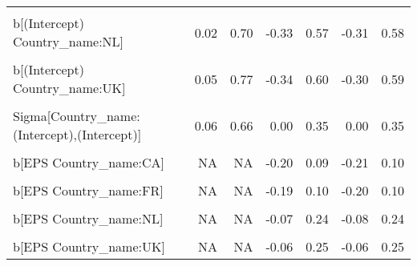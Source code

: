 \begin{table}
\begin{tabular}[t]{lrrrrrr}
\cellcolor{gray!10}{b[(Intercept) Country\_name:IL]} & \cellcolor{gray!10}{-0.88} & \cellcolor{gray!10}{0.77} & \cellcolor{gray!10}{-0.53} & \cellcolor{gray!10}{0.42} & \cellcolor{gray!10}{-0.56} & \cellcolor{gray!10}{0.43}\\
b[(Intercept) Country\_name:NL] & 0.02 & 0.70 & -0.33 & 0.57 & -0.31 & 0.58\\
\cellcolor{gray!10}{b[(Intercept) Country\_name:SE]} & \cellcolor{gray!10}{-0.76} & \cellcolor{gray!10}{-0.01} & \cellcolor{gray!10}{-0.60} & \cellcolor{gray!10}{0.32} & \cellcolor{gray!10}{-0.62} & \cellcolor{gray!10}{0.34}\\
b[(Intercept) Country\_name:UK] & 0.05 & 0.77 & -0.34 & 0.60 & -0.30 & 0.59\\
\cellcolor{gray!10}{b[(Intercept) Country\_name:US]} & \cellcolor{gray!10}{-0.60} & \cellcolor{gray!10}{0.16} & \cellcolor{gray!10}{-0.52} & \cellcolor{gray!10}{0.29} & \cellcolor{gray!10}{-0.49} & \cellcolor{gray!10}{0.29}\\
Sigma[Country\_name:(Intercept),(Intercept)] & 0.06 & 0.66 & 0.00 & 0.35 & 0.00 & 0.35\\
\cellcolor{gray!10}{b[EPS Country\_name:BE]} & \cellcolor{gray!10}{NA} & \cellcolor{gray!10}{NA} & \cellcolor{gray!10}{-0.04} & \cellcolor{gray!10}{0.30} & \cellcolor{gray!10}{-0.05} & \cellcolor{gray!10}{0.30}\\
b[EPS Country\_name:CA] & NA & NA & -0.20 & 0.09 & -0.21 & 0.10\\
\cellcolor{gray!10}{b[EPS Country\_name:CH]} & \cellcolor{gray!10}{NA} & \cellcolor{gray!10}{NA} & \cellcolor{gray!10}{-0.18} & \cellcolor{gray!10}{0.11} & \cellcolor{gray!10}{-0.19} & \cellcolor{gray!10}{0.10}\\
b[EPS Country\_name:FR] & NA & NA & -0.19 & 0.10 & -0.20 & 0.10\\
\cellcolor{gray!10}{b[EPS Country\_name:IL]} & \cellcolor{gray!10}{NA} & \cellcolor{gray!10}{NA} & \cellcolor{gray!10}{-0.30} & \cellcolor{gray!10}{0.28} & \cellcolor{gray!10}{-0.29} & \cellcolor{gray!10}{0.26}\\
b[EPS Country\_name:NL] & NA & NA & -0.07 & 0.24 & -0.08 & 0.24\\
\cellcolor{gray!10}{b[EPS Country\_name:SE]} & \cellcolor{gray!10}{NA} & \cellcolor{gray!10}{NA} & \cellcolor{gray!10}{-0.26} & \cellcolor{gray!10}{0.06} & \cellcolor{gray!10}{-0.26} & \cellcolor{gray!10}{0.06}\\
b[EPS Country\_name:UK] & NA & NA & -0.06 & 0.25 & -0.06 & 0.25\\

\end{tabular}
\end{table}
